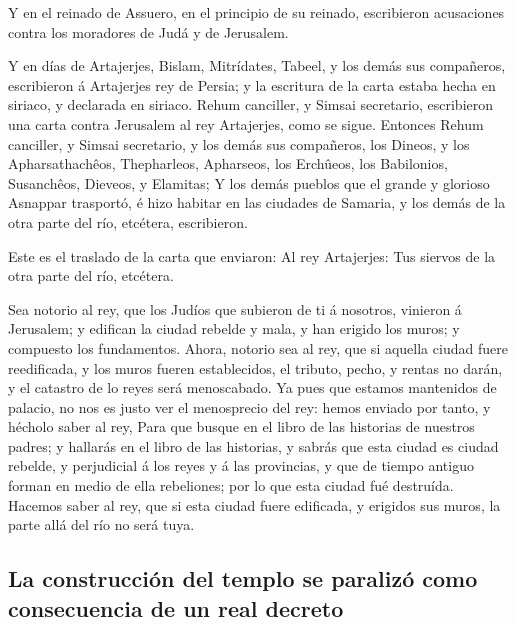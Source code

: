  Y en el reinado de Assuero, en el principio de su
reinado, escribieron acusaciones contra los moradores de Judá y de
Jerusalem.

 Y en días de Artajerjes, Bislam, Mitrídates, Tabeel, y
los demás sus compañeros, escribieron á Artajerjes rey de Persia; y la
escritura de la carta estaba hecha en siriaco, y declarada en siriaco.
 Rehum canciller, y Simsai secretario, escribieron una
carta contra Jerusalem al rey Artajerjes, como se sigue. 
Entonces Rehum canciller, y Simsai secretario, y los demás sus
compañeros, los Dineos, y los Apharsathachêos, Thepharleos, Apharseos,
los Erchûeos, los Babilonios, Susanchêos, Dieveos, y Elamitas;
 Y los demás pueblos que el grande y glorioso Asnappar
trasportó, é hizo habitar en las ciudades de Samaria, y los demás de la
otra parte del río, etcétera, escribieron.

 Este es el traslado de la carta que enviaron: Al rey
Artajerjes: Tus siervos de la otra parte del río, etcétera.

 Sea notorio al rey, que los Judíos que subieron de ti á
nosotros, vinieron á Jerusalem; y edifican la ciudad rebelde y mala, y
han erigido los muros; y compuesto los fundamentos. 
Ahora, notorio sea al rey, que si aquella ciudad fuere reedificada, y
los muros fueren establecidos, el tributo, pecho, y rentas no darán, y
el catastro de lo reyes será menoscabado.  Ya pues que
estamos mantenidos de palacio, no nos es justo ver el menosprecio del
rey: hemos enviado por tanto, y hécholo saber al rey, 
Para que busque en el libro de las historias de nuestros padres; y
hallarás en el libro de las historias, y sabrás que esta ciudad es
ciudad rebelde, y perjudicial á los reyes y á las provincias, y que de
tiempo antiguo forman en medio de ella rebeliones; por lo que esta
ciudad fué destruída.  Hacemos saber al rey, que si esta
ciudad fuere edificada, y erigidos sus muros, la parte allá del río no
será tuya.

\hypertarget{la-construcciuxf3n-del-templo-se-paralizuxf3-como-consecuencia-de-un-real-decreto}{%
\subsection{La construcción del templo se paralizó como consecuencia de
un real
decreto}\label{la-construcciuxf3n-del-templo-se-paralizuxf3-como-consecuencia-de-un-real-decreto}}

